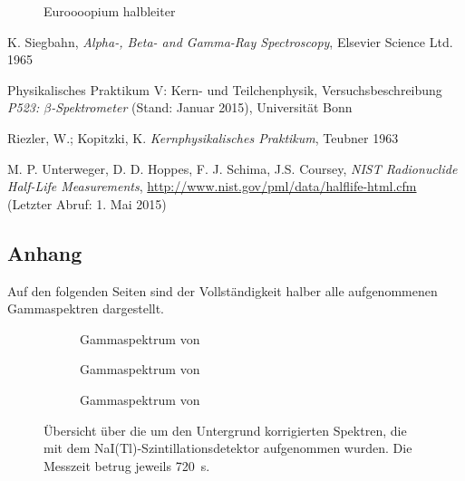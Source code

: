 \documentclass[11pt, a4paper]{article}
\numberwithin{equation}{section}
\newcommand{\co}{\isotope[60]{Co}}
\newcommand{\cs}{\isotope[137]{Cs}}
\begin{document}
\begin{figure}[h]
	\centering
	
	\caption{Euroooopium halbleiter}
	\label{fig:halb_europium_spektrum}
\end{figure}

\FloatBarrier
\vspace{\fill}
\begin{thebibliography}{19}
	K. Siegbahn,
	\emph{Alpha-, Beta- and Gamma-Ray Spectroscopy},
	Elsevier Science Ltd. 1965

	Physikalisches Praktikum V: Kern- und Teilchenphysik,
	Versuchsbeschreibung \emph{P523: $\beta$-Spektrometer} (Stand: Januar 2015),
	Universität Bonn	

	Riezler, W.; Kopitzki, K.
	\emph{Kernphysikalisches Praktikum},
	Teubner 1963

	M. P. Unterweger, D. D. Hoppes, F. J. Schima, J.S. Coursey,
	\emph{NIST Radionuclide Half-Life Measurements},
	\url{http://www.nist.gov/pml/data/halflife-html.cfm} (Letzter Abruf: 1. Mai 2015)

\end{thebibliography}

\begin{appendix}
\section{Anhang}
Auf den folgenden Seiten sind der Vollständigkeit halber alle aufgenommenen Gammaspektren dargestellt.
\begin{figure}[ht]
	\centering
	\begin{subfigure}[b]{0.65\textwidth}
		\resizebox{!}{0.285\textheight}{
			
		}
		\caption{Gammaspektrum von \cs}
		\label{fig:szin_caesium_spektrum}
	\end{subfigure}
	
	\begin{subfigure}[b]{0.65\textwidth}
		\resizebox{!}{0.285\textheight}{
			
		}
		\caption{Gammaspektrum von \co}
		\label{fig:szin_cobalt_spektrum}
	\end{subfigure}
	
	\begin{subfigure}[b]{0.65\textwidth}
		\resizebox{!}{0.285\textheight}{		
			
		}
		\caption{Gammaspektrum von }
		\label{fig:szin_europium_spektrum}
	\end{subfigure}
	\caption{Übersicht über die um den Untergrund korrigierten Spektren, die mit dem NaI(Tl)-Szintillationsdetektor aufgenommen wurden. Die Messzeit betrug jeweils \SI{720}{\second}.}
\end{figure}
\end{appendix}
\end{document}
